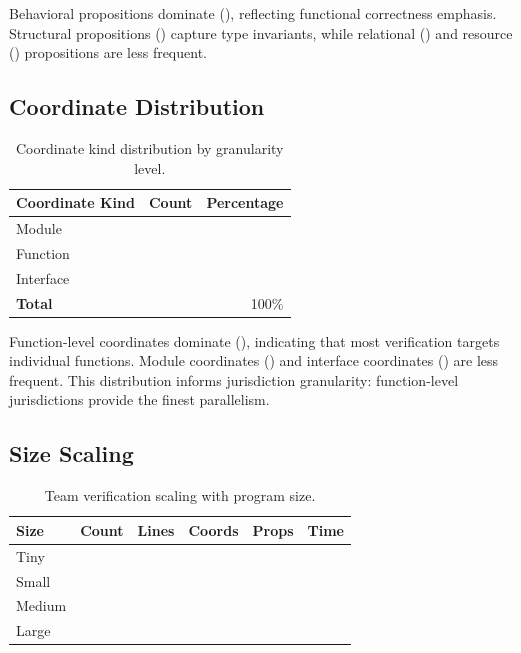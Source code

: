 \documentclass[11pt]{article}
\begin{document}
Behavioral propositions dominate (\suppPropBehavioralPct{}), reflecting
functional correctness emphasis. Structural propositions
(\suppPropStructuralPct{}) capture type invariants, while relational
(\suppPropRelationalPct{}) and resource (\suppPropResourcePct{}) propositions
are less frequent.

\subsection{Coordinate Distribution}

\begin{table}[t]
\centering
\caption{Coordinate kind distribution by granularity level.}
\label{tab:coord-breakdown}
\begin{tabular}{lrr}
\toprule
\textbf{Coordinate Kind} & \textbf{Count} & \textbf{Percentage} \\
\midrule
Module    & \suppCoordModuleCount{} & \suppCoordModulePct{} \\
Function  & \suppCoordFunctionCount{} & \suppCoordFunctionPct{} \\
Interface & \suppCoordInterfaceCount{} & \suppCoordInterfacePct{} \\
\midrule
\textbf{Total} & \suppCoordTotal{} & 100\% \\
\bottomrule
\end{tabular}
\end{table}

Function-level coordinates dominate (\suppCoordFunctionPct{}),
indicating that most verification targets individual functions. Module
coordinates (\suppCoordModulePct{}) and interface coordinates
(\suppCoordInterfacePct{}) are less frequent. This distribution informs
jurisdiction granularity: function-level jurisdictions provide the finest
parallelism.

\subsection{Size Scaling}

\begin{table}[t]
\centering
\caption{Team verification scaling with program size.}
\label{tab:size-scaling}
\begin{tabular}{lrrrrr}
\toprule
\textbf{Size} & \textbf{Count} & \textbf{Lines} &
  \textbf{Coords} & \textbf{Props} & \textbf{Time} \\
\midrule
Tiny   & \compTinyCount{} & \compTinyMeanLines{}
       & \compTinyMeanCoords{} & \compTinyMeanProps{} & \compTinyMeanTime{} \\
Small  & \compSmallCount{} & \compSmallMeanLines{}
       & \compSmallMeanCoords{} & \compSmallMeanProps{} & \compSmallMeanTime{} \\
Medium & \compMediumCount{} & \compMediumMeanLines{}
       & \compMediumMeanCoords{} & \compMediumMeanProps{} & \compMediumMeanTime{} \\
Large  & \compLargeCount{} & \compLargeMeanLines{}
       & \compLargeMeanCoords{} & \compLargeMeanProps{} & \compLargeMeanTime{} \\
\bottomrule
\end{tabular}
\end{table}
\end{document}
